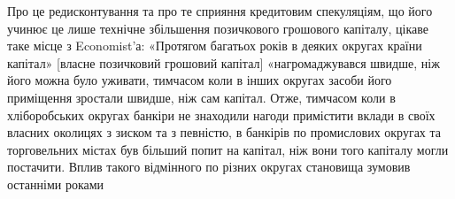 Про це редисконтування та про те сприяння кредитовим спекуляціям, що
його учинює це лише технічне збільшення позичкового грошового капіталу, цікаве
таке місце з Economist’а: «Протягом багатьох років в деяких округах країни
капітал» [власне позичковий грошовий капітал] «нагромаджувався швидше, ніж
його можна було уживати, тимчасом коли в інших округах засоби його приміщення
зростали швидше, ніж сам капітал. Отже, тимчасом коли в хліборобських округах
банкіри не знаходили нагоди примістити вклади в своїх власних околицях з
зиском та з певністю, в банкірів по промислових округах та торговельних містах
був більший попит на капітал, ніж вони того капіталу могли постачити. Вплив
такого відмінного по різних округах становища зумовив останніми роками
\parbreak{}  %
